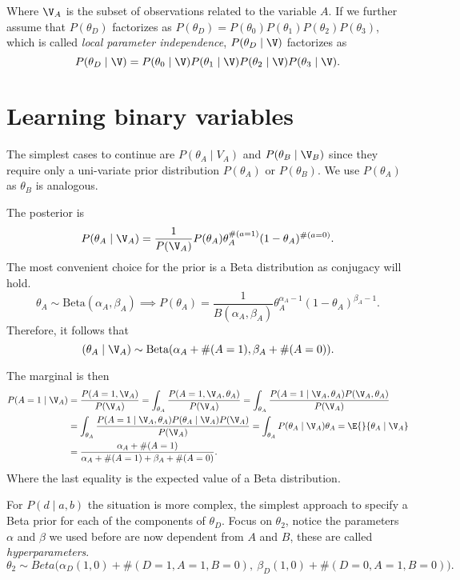 Where \(\V_{A}\) is the subset of observations related to the variable \(A\). If we further assume that \(P(\theta_{D})\) factorizes as
\(P(\theta_{D}) = P(\theta_{0})P(\theta_{1})P(\theta_{2})P(\theta_{3})\),
which is called \emph{local parameter independence}, \(P(\theta_{D} \mid \V)\) factorizes as
\[
  P(\theta_{D}\mid \V) = P(\theta_{0} \mid \V )P(\theta_{1} \mid \V )P(\theta_{2} \mid \V )P(\theta_{3} \mid \V ).
\]

\section{Learning binary variables}

The simplest cases to continue are \(P(\theta_{A} \mid V_{A})\) and
\(P(\theta_{B} \mid \V_{B})\) since they require only a uni-variate prior distribution
\(P(\theta_{A})\) or \(P(\theta_{B})\). We use \(P(\theta_{A})\) as \(\theta_{B}\)
is analogous.

The posterior is
\[
  P(\theta_{A} \mid \V_{A}) = \frac{1}{P(\V_{A})}P(\theta_{A})\theta_{A}^{\#(a=1)}(1-\theta_{A})^{\#(a=0)}.
\]
The most convenient choice for the prior is a Beta distribution as conjugacy
will hold.
\[
  \theta_{A} \sim \text{Beta}(\alpha_{A}, \beta_{A}) \implies P(\theta_{A})  = \frac{1}{B(\alpha_{A}, \beta_{A})}\theta_{A}^{\alpha_{A}-1}(1-\theta_{A})^{\beta_{A} - 1}.
\]
Therefore, it follows that
\[
  (\theta_{A} \mid \V_{A}) \sim \text{Beta}(\alpha_{A} + \#(A=1), \beta_{A} + \#(A = 0)).
\]

The marginal is then
\[
  \begin{aligned}
    P(A = 1 \mid \V_{A})
    &= \frac{P(A = 1, \V_{A})}{P(\V_{A})} = \int_{\theta_{A}}  \frac{P(A = 1, \V_{A}, \theta_{A})}{P(\V_{A})} =  \int_{\theta_{A}}  \frac{P(A = 1 \mid \V_{A}, \theta_{A}) P(\V_{A}, \theta_{A})}{P(\V_{A})} \\
    &=  \int_{\theta_{A}}  \frac{P(A = 1 \mid \V_{A}, \theta_{A}) P(\theta_{A} \mid \V_{A})P(\V_{A})}{P(\V_{A})} = \int_{\theta_{A}}P(\theta_{A}\mid \V_{A})\theta_{A} = \E{}{\theta_{A} \mid \V_{A}} \\
    &= \frac{\alpha_{A} + \#(A= 1)}{\alpha_{A} + \#(A=1) + \beta_{A} + \#(A=0)}.
  \end{aligned}
\]
Where the last equality is the expected value of a Beta distribution.

For \(P(d \mid a ,b)\) the situation is more complex, the simplest approach
to specify a Beta prior for each of the components of \(\theta_{D}\).
Focus on \(\theta_{2}\), notice the parameters \(\alpha\)
and \(\beta\) we used before are now dependent from \(A\) and \(B\), these
are called \emph{hyperparameters}.
\[
  \theta_{2} \sim Beta\Big(\alpha_{D}(1,0) + \#(D = 1, A = 1, B = 0), \ \beta_{D}(1,0) + \#(D = 0, A = 1, B = 0)\Big).
\]

